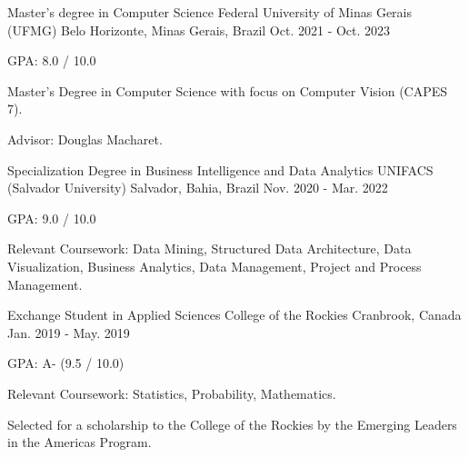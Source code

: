 

\begin{cventries}

  \cventry
    {Master's degree in Computer Science}
    {Federal University of Minas Gerais (UFMG)}
    {Belo Horizonte, Minas Gerais, Brazil}
    {Oct. 2021 - Oct. 2023}
    {
        \begin{cvitems}
        \item {GPA: 8.0 / 10.0}
        \item {Master's Degree in Computer Science with focus on Computer Vision (CAPES 7).}
        \item {Advisor: Douglas Macharet.}
        \end{cvitems}
    }


  \cventry
    {Specialization Degree in Business Intelligence and Data Analytics}
    {UNIFACS (Salvador University)}
    {Salvador, Bahia, Brazil}
    {Nov. 2020 - Mar. 2022}
    {
        \begin{cvitems}
        \item {GPA: 9.0 / 10.0}
        \item {Relevant Coursework: Data Mining, Structured Data Architecture, Data Visualization, Business Analytics, Data Management, Project and Process Management.}
        \end{cvitems}
    }


  \cventry
    {Exchange Student in Applied Sciences} %
    {College of the Rockies} %
    {Cranbrook, Canada} %
    {Jan. 2019 - May. 2019} %
    {
      \begin{cvitems} %
        \item {GPA: A- (9.5 / 10.0)}
        \item {Relevant Coursework: Statistics, Probability, Mathematics.}
        \item {Selected for a scholarship to the College of the Rockies by the Emerging Leaders in the Americas Program.}
      \end{cvitems}
    }



\end{cventries}
